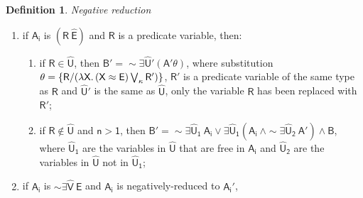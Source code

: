 \documentclass[inscr,ack,preface]{dithesis}
\theoremstyle{definition}
\newtheorem{definition}{Definition}[]
\newcommand{\msf}[1]{$\mathsf{#1}$}
\begin{document}
\begin{definition}{\emph{Negative reduction}}
\begin{enumerate}
\begin{enumerate}
                \\where \msf{\theta = unify \left( E_1, E_2 \right)} and \msf{\widehat{X} = dom\left( \theta \right)};
          \item if \msf{\sim \exists \widehat{U} \left( E_1 \approx E_2 \right)} is unsatisfiable and either \msf{E_1} or \msf{E_2} is a variable in \msf{\widehat{U}},
          \\then \msf{B' = \sim \exists \widehat{U} \left( A' \theta \right)}, where \msf{\theta = \{ X / E \}} and \msf{X} is the one expression that is a variable in \msf{\widehat{U}} and \msf{E} is the other;
          \item if \msf{\sim \exists \widehat{U} \left( E_1 \approx E_2 \right)}
                is primitive and \msf{n > 1}, \\
                then \msf{B' = \sim \exists \widehat{U}_1 ~ A_i \lor \exists \widehat{U}_1 \left( A_i ~\land \sim \exists \widehat{U}_2 ~ A' \right)}, where \msf{\widehat{U}_1} are the variables in \msf{\widehat{U}} that are free in \msf{A_i} and \msf{\widehat{U}_2} are the variables in \msf{\widehat{U}} not in \msf{\widehat{U}_1};
        \end{enumerate}
  \item if \msf{A_i} is \msf{\left( R ~ \widehat{E} \right)} and \msf{R} is a predicate variable, then:
        \begin{enumerate}
          \item if \msf{R \in \widehat{U}},
                then \msf{B' = \sim \exists \widehat{U}' \left( A' \theta \right)},
                where substitution \msf{\theta = \left\{ R \middle/ \left( \lambda X . \left( X \approx E \right) \bigvee_{\kappa} R' \right) \right\}}, \msf{R'} is a predicate variable of the same type as \msf{R} and \msf{\widehat{U}'} is the same as \msf{\widehat{U}}, only the variable \msf{R} has been replaced with \msf{R'};
          \item if \msf{R \not \in \widehat{U}} and \msf{n > 1},
                then \msf{B' = \sim \exists \widehat{U}_1 ~ A_i \lor \exists \widehat{U}_1 \left( A_i ~\land \sim \exists \widehat{U}_2 ~ A' \right) \land B},
                where \msf{\widehat{U}_1} are the variables in \msf{\widehat{U}} that are free in \msf{A_i} and \msf{\widehat{U}_2} are the variables in \msf{\widehat{U}} not in \msf{\widehat{U}_1};
        \end{enumerate}
  \item if \msf{A_i} is \msf{\sim \exists \widehat{V} ~ E} and \msf{A_i} is negatively-reduced to \msf{A_i'}, \\

\end{enumerate}
\end{definition}
\end{document}
